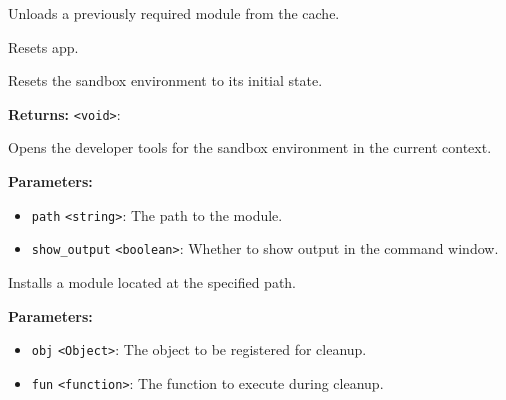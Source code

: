 \documentclass[12pt,a4paper]{article}
\begin{document}
\noindent Unloads a previously required module from the cache.

\vspace{5mm}
\noindent {}


\noindent Resets app.

\vspace{5mm}
\noindent {}


\noindent Resets the sandbox environment to its initial state.

\vspace{5mm}
\noindent {}


\noindent \textbf{Returns:} \texttt{<void>}:

\noindent Opens the developer tools for the sandbox environment in the current context.

\vspace{5mm}
\noindent {}


\noindent \textbf{Parameters:}
\begin{itemize}
  \item \texttt{path} \texttt{<string>}: The path to the module.
  \item \texttt{show\_output} \texttt{<boolean>}: Whether to show output in the command window.
\end{itemize}

\noindent Installs a module located at the specified path.

\vspace{5mm}
\noindent {}


\noindent \textbf{Parameters:}
\begin{itemize}
  \item \texttt{obj} \texttt{<Object>}: The object to be registered for cleanup.
  \item \texttt{fun} \texttt{<function>}: The function to execute during cleanup.
\end{itemize}
\end{document}
